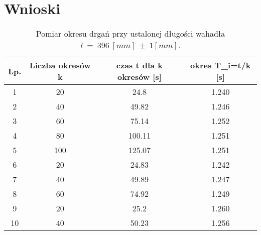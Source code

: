 \documentclass[a4paper,12pts]{report}
\begin{document}
	\section{Wnioski}
	

		
	\begin{table}[hb!]
		\centering
		\begin{tabular}{ | c | c | c | c | }
			\hline
			\textrm{Lp.} & \textrm{Liczba okresów } k & \textrm{czas } t \textrm{ dla } k \textrm{ okresów } [s] & \textrm{okres } T_i=t/k [s] \\ \hline
			1 & 20 & 24.8 & 1.240 \\ \hline
			2 & 40 & 49.82 & 1.246 \\ \hline
			3 & 60 & 75.14 & 1.252 \\ \hline
			4 & 80 & 100.11 & 1.251 \\ \hline
			5 & 100 & 125.07 & 1.251 \\ \hline
			6 & 20 & 24.83 & 1.242 \\ \hline
			7 & 40 & 49.89 & 1.247 \\ \hline
			8 & 60 & 74.92 & 1.249 \\ \hline
			9 & 20 & 25.2 & 1.260 \\ \hline
			10 & 40 & 50.23 & 1.256 \\ \hline
		\end{tabular}
		\caption{Pomiar okresu drgań przy ustalonej długości wahadła $l~=~396~[mm]~\pm~1 [mm]$.}
		\label{Tabela1}	
	\end{table}
	
\end{document}

